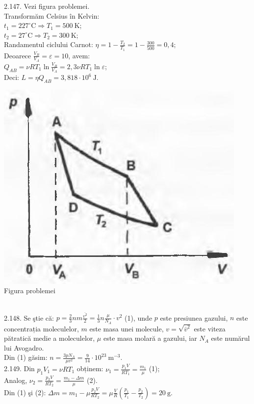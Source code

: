 2.147. Vezi figura problemei.\\ Transformăm Celsius în Kelvin:\\ $t_{1}=227^{\circ} \mathrm{C} \Rightarrow T_{1}=500 \mathrm{~K}$;\\ $t_{2}=27^{\circ} \mathrm{C} \Rightarrow T_{2}=300 \mathrm{~K}$;\\ Randamentul ciclului Carnot: $\eta=1-\frac{T_{2}}{T_{1}}=1-\frac{300}{500}=0,4$;\\ Deoarece $\frac{V_{B}}{V_{A}}=\varepsilon=10$, avem:\\ $Q_{A B}=\nu R T_{1} \ln \frac{V_{B}}{V_{A}}=2,3 \nu R T_{1} \ln \varepsilon$;\\ Deci: $L=\eta Q_{A B}=3,818 \cdot 10^{6} \mathrm{~J}$.\\ \begin{center} \includegraphics[width=0.4\linewidth]{images/2025_07_01_5b3ff9fa0d508c8e9f17g-300}\\ Figura problemei \end{center}\\

2.148. Se ştie că: $p=\frac{2}{3} n m \frac{\overline{v^{2}}}{2}=\frac{1}{3} n \frac{\mu}{N_{A}} \cdot v^{2}$ (1), unde $p$ este presiunea gazului, $n$ este concentrația moleculelor, $m$ este masa unei molecule, $v=\sqrt{\bar{v}^{2}}$ este viteza pătratică medie a moleculelor, $\mu$ este masa molară a gazului, iar $N_{A}$ este numărul lui Avogadro.\\ Din (1) găsim: $n=\frac{3 p N_{A}}{\mu v^{2}}=\frac{9}{14} \cdot 10^{23} \mathrm{~m}^{-3}$.\\

2.149. Din $p_{1} V_{1}=\nu R T_{1}$ obținem: $\nu_{1}=\frac{p_{1} V}{R T_{1}}=\frac{m_{1}}{\mu}$ (1);\\ Analog, $\nu_{2}=\frac{p_{2} V}{R T_{2}}=\frac{m_{1}-\Delta m}{\mu}$ (2).\\ Din (1) şi (2): $\Delta m=m_{1}-\mu \frac{p_{2} V}{R T_{2}}=\mu \frac{V}{R}\left(\frac{p_{1}}{T_{1}}-\frac{p_{2}}{T_{2}}\right)=20 \mathrm{~g}$.\\

